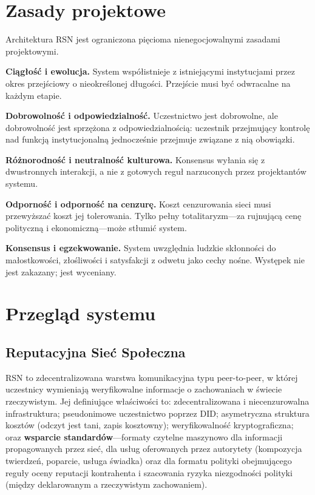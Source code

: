 \documentclass[11pt,a4paper,twocolumn]{article}
\begin{document}
\section{Zasady projektowe}

Architektura RSN jest ograniczona pięcioma nienegocjowalnymi zasadami projektowymi.

\textbf{Ciągłość i ewolucja.} System współistnieje z istniejącymi instytucjami przez okres przejściowy o nieokreślonej długości. Przejście musi być odwracalne na każdym etapie.

\textbf{Dobrowolność i odpowiedzialność.} Uczestnictwo jest dobrowolne, ale dobrowolność jest sprzężona z odpowiedzialnością: uczestnik przejmujący kontrolę nad funkcją instytucjonalną jednocześnie przejmuje związane z nią obowiązki.

\textbf{Różnorodność i neutralność kulturowa.} Konsensus wyłania się z dwustronnych interakcji, a nie z gotowych reguł narzuconych przez projektantów systemu.

\textbf{Odporność i odporność na cenzurę.} Koszt cenzurowania sieci musi przewyższać koszt jej tolerowania. Tylko pełny totalitaryzm---za rujnującą cenę polityczną i ekonomiczną---może stłumić system.

\textbf{Konsensus i egzekwowanie.} System uwzględnia ludzkie skłonności do małostkowości, złośliwości i satysfakcji z odwetu jako cechy nośne. Występek nie jest zakazany; jest wyceniany.

\section{Przegląd systemu}

\subsection{Reputacyjna Sieć Społeczna}

RSN to zdecentralizowana warstwa komunikacyjna typu peer-to-peer, w której uczestnicy wymieniają weryfikowalne informacje o zachowaniach w świecie rzeczywistym. Jej definiujące właściwości to: zdecentralizowana i niecenzurowalna infrastruktura; pseudonimowe uczestnictwo poprzez DID; asymetryczna struktura kosztów (odczyt jest tani, zapis kosztowny); weryfikowalność kryptograficzna; oraz \textbf{wsparcie standardów}---formaty czytelne maszynowo dla informacji propagowanych przez sieć, dla usług oferowanych przez autorytety (kompozycja twierdzeń, poparcie, usługa świadka) oraz dla formatu polityki obejmującego reguły oceny reputacji kontrahenta i szacowania ryzyka niezgodności polityki (między deklarowanym a rzeczywistym zachowaniem).
\end{document}
